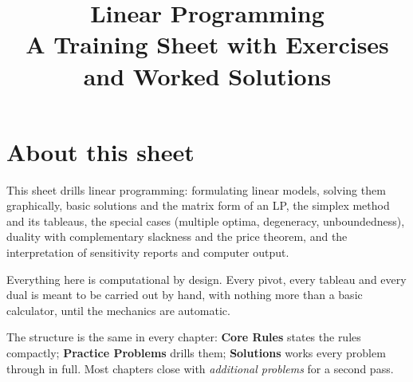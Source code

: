 \documentclass[10pt,oneside]{book}
\title{\Huge Linear Programming\\[0.4em]
  \large A Training Sheet with Exercises and Worked Solutions}
\author{}
\date{}
\begin{document}
\frontmatter
\maketitle

\chapter*{About this sheet}

This sheet drills linear programming: formulating linear models, solving
them graphically, basic solutions and the matrix form of an LP, the simplex
method and its tableaus, the special cases (multiple optima, degeneracy,
unboundedness), duality with complementary slackness and the price theorem,
and the interpretation of sensitivity reports and computer output.

Everything here is computational by design. Every pivot, every tableau and
every dual is meant to be carried out by hand, with nothing more than a
basic calculator, until the mechanics are automatic.

The structure is the same in every chapter: \textbf{Core Rules} states the
rules compactly; \textbf{Practice Problems} drills them; \textbf{Solutions}
works every problem through in full. Most chapters close with
\emph{additional problems} for a second pass.

\tableofcontents

\mainmatter








\end{document}
